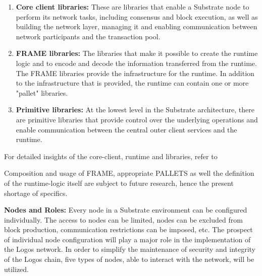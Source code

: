 \documentclass[]{article}
\begin{document}
\begin{enumerate}[label=\textbullet]
	\item\textbf{Core client libraries:}
    These are libraries that enable a Substrate node to perform its network tasks, including consensus and block execution, as well as building the network layer, managing it and enabling communication between network participants and the transaction pool. 
	
	\item\textbf{FRAME libraries:} 
    The libraries that make it possible to create the runtime logic and to encode and decode the information transferred from the runtime.
    The FRAME libraries provide the infrastructure for the runtime.
    In addition to the infrastructure that is provided, the runtime can contain one or more "pallet" libraries.    
	
	\item\textbf{Primitive libraries:} 
	At the lowest level in the Substrate architecture, there are primitive libraries that provide control over the underlying operations and enable communication between the central outer client services and the runtime.	
\end{enumerate}
For detailed insights of the core-client, runtime and libraries, refer to \cite{SubstrateDoc-arch}

Composition and usage of FRAME, appropriate PALLETS as well the definition of the runtime-logic itself are subject to future research, hence the present shortage of specifics.
\newline

\textbf{Nodes and Roles:}
Every node in a Substrate environment can be configured individually. 
The access to nodes can be limited, nodes can be excluded from block production, communication restrictions can be imposed, etc.
The prospect of individual node configuration will play a major role in the implementation of the Logos network.
In order to simplify the maintenance of security and integrity of the Logos chain, five types of nodes, able to interact with the network, will be utilized. 
\end{document}
